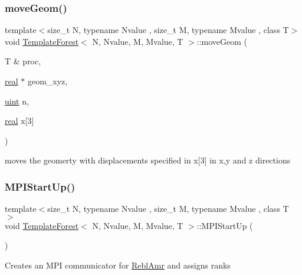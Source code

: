 \subsubsection{\texorpdfstring{move\+Geom()}{moveGeom()}}
{\footnotesize\ttfamily template$<$size\+\_\+t N, typename Nvalue , size\+\_\+t M, typename Mvalue , class T$>$ \\
void \mbox{\hyperlink{classTemplateForest}{Template\+Forest}}$<$ N, Nvalue, M, Mvalue, T $>$\+::move\+Geom (\begin{DoxyParamCaption}\item[{T \&}]{proc,  }\item[{\mbox{\hyperlink{definitions_8h_aedc0ad84d1e764530814f57ad931d02a}{real}} $\ast$}]{geom\+\_\+xyz,  }\item[{\mbox{\hyperlink{definitions_8h_a69aa29b598b851b0640aa225a9e5d61d}{uint}}}]{n,  }\item[{\mbox{\hyperlink{definitions_8h_aedc0ad84d1e764530814f57ad931d02a}{real}}}]{x\mbox{[}3\mbox{]} }\end{DoxyParamCaption})}

moves the geomerty with displacements specified in x\mbox{[}3\mbox{]} in x,y and z directions \mbox{\label{classTemplateForest_aec26a86ef4768ba448de15c612faf40d}} 
\subsubsection{\texorpdfstring{M\+P\+I\+Start\+Up()}{MPIStartUp()}}
{\footnotesize\ttfamily template$<$size\+\_\+t N, typename Nvalue , size\+\_\+t M, typename Mvalue , class T $>$ \\
void \mbox{\hyperlink{classTemplateForest}{Template\+Forest}}$<$ N, Nvalue, M, Mvalue, T $>$\+::M\+P\+I\+Start\+Up (\begin{DoxyParamCaption}{ }\end{DoxyParamCaption})}

Creates an M\+PI communicator for \mbox{\hyperlink{classReblAmr}{Rebl\+Amr}} and assigns ranks \mbox{\label{classTemplateForest_a67af26aae3ccfcca14be70be3d9553ee}} 
